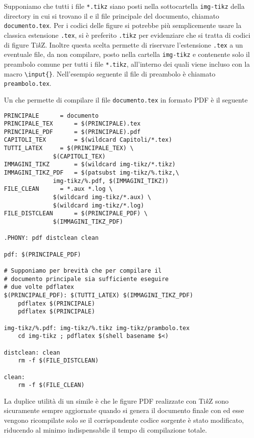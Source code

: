Supponiamo che tutti i file \texttt{*.tikz} siano posti nella sottocartella
\texttt{img-tikz} della directory in cui si trovano il  e il
file principale del documento, chiamato \texttt{documento.tex}. Per i codici
delle figure si potrebbe più semplicemente usare la classica estensione
\texttt{.tex}, si è preferito \texttt{.tikz} per evidenziare che si tratta di
codici di figure Ti\emph{k}Z.  Inoltre questa scelta permette di riservare
l'estensione \texttt{.tex} a un eventuale file, da non compilare, posto nella
cartella \texttt{img-tikz} e contenente solo il preambolo comune per tutti i
file \texttt{*.tikz}, all'interno dei quali viene incluso con la macro
\texttt{\textbackslash{}input\{\}}.  Nell'esempio seguente il file di preambolo
è chiamato \texttt{preambolo.tex}.

Un  che permette di compilare il file \texttt{documento.tex}
in formato \textsc{PDF} è il seguente
\begin{lstlisting}
PRINCIPALE 	    = documento
PRINCIPALE_TEX	    = $(PRINCIPALE).tex
PRINCIPALE_PDF	    = $(PRINCIPALE).pdf
CAPITOLI_TEX	    = $(wildcard Capitoli/*.tex)
TUTTI_LATEX	    = $(PRINCIPALE_TEX) \
		      $(CAPITOLI_TEX)
IMMAGINI_TIKZ	    = $(wildcard img-tikz/*.tikz)
IMMAGINI_TIKZ_PDF   = $(patsubst img-tikz/%.tikz,\
		      img-tikz/%.pdf, $(IMMAGINI_TIKZ))
FILE_CLEAN	    = *.aux *.log \
		      $(wildcard img-tikz/*.aux) \
		      $(wildcard img-tikz/*.log)
FILE_DISTCLEAN	    = $(PRINCIPALE_PDF) \
		      $(IMMAGINI_TIKZ_PDF)

.PHONY: pdf distclean clean

pdf: $(PRINCIPALE_PDF)

# Supponiamo per brevità che per compilare il
# documento principale sia sufficiente eseguire
# due volte pdflatex
$(PRINCIPALE_PDF): $(TUTTI_LATEX) $(IMMAGINI_TIKZ_PDF)
	pdflatex $(PRINCIPALE)
	pdflatex $(PRINCIPALE)

img-tikz/%.pdf: img-tikz/%.tikz img-tikz/prambolo.tex
	cd img-tikz ; pdflatex $(shell basename $<)

distclean: clean
	rm -f $(FILE_DISTCLEAN)

clean:
	rm -f $(FILE_CLEAN)
\end{lstlisting}
La duplice utilità di un simile  è che le figure
\textsc{PDF} realizzate con Ti\emph{k}Z sono sicuramente sempre aggiornate
quando si genera il documento finale con  ed esse vengono
ricompilate solo se il corrispondente codice sorgente è stato modificato,
riducendo al minimo indispensabile il tempo di compilazione totale.

